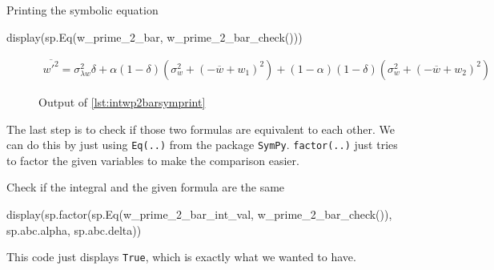 \begin{listing}[!ht]
    \caption{Printing the symbolic equation}
    \label{lst:intwp2barsymprint}
    \begin{pythoncode}
        display(sp.Eq(w_prime_2_bar, w_prime_2_bar_check()))
    \end{pythoncode}
\end{listing}
\begin{figure}[!ht]
    \centering
    \caption{Output of \cref{lst:intwp2barsymprint}}
    \label{fig:intwp2barsymprintout}
    \begin{align}
        \nonumber
        \overline{w'^2} = \sigma_{\lambda w}^{2} \delta + \alpha \left(1 - \delta\right) \left(\sigma_{w}^{2} + \left(- \overline{w} + w_{1}\right)^{2}\right) + \left(1 - \alpha\right) \left(1 - \delta\right) \left(\sigma_{w}^{2} + \left(- \overline{w} + w_{2}\right)^{2}\right)
    \end{align}
\end{figure}
The last step is to check if those two formulas are equivalent to each other.
We can do this by just using \texttt{Eq(..)} from the package \texttt{SymPy}.
\texttt{factor(..)} just tries to factor the given variables to make the comparison easier.
\begin{listing}[!ht]
    \caption{Check if the integral and the given formula are the same}
    \label{lst:intwp2barfinalcheck}
    \begin{pythoncode}
        display(sp.factor(sp.Eq(w_prime_2_bar_int_val, w_prime_2_bar_check()),
            sp.abc.alpha, sp.abc.delta))
    \end{pythoncode}
\end{listing}
This code just displays \texttt{True}, which is exactly what we wanted to have.